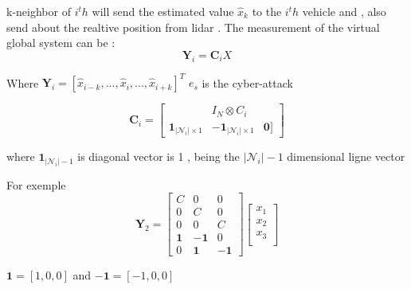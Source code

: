 \documentclass[letterpaper, 10pt, conference]{ieeeconf}  %
\begin{document}

k-neighbor of $i^th$ will send the estimated value $\hat{x}_k $ to the $i^th$ vehicle and , also send about the realtive position from lidar . The measurement of the virtual global system can be :
\begin{equation*}\label{CACC}
      \mathbf{Y}_i = \mathbf{C}_i X    
\end{equation*}  

Where $\mathbf{Y}_i = [\hat{x}_{i-k} ,..., \hat{x}_{i},..., \hat{x}_{i+k} ]^T$  
$e_s$ is the cyber-attack  

\begin{equation}
\mathbf{C}_i=\left[\begin{array}{ccc}
 & I_N \otimes C_i & \\
\mathbf{1}_{\left|\mathcal{N}_i\right| \times 1} & \mathbf{-1}_{\left|\mathcal{N}_i\right| \times 1} & \mathbf{0}]
\end{array}\right]
\end{equation}

where $\mathbf{1}_{\left|\mathcal{N}_i\right|-1 }$
is diagonal vector is 1 , being the $\left|\mathcal{N}_i\right|-1$ dimensional ligne vector 

For exemple 
\begin{equation}
    \mathbf{Y}_2 = \begin{bmatrix}
         C & 0 & 0    \\
         0 & C & 0   \\
         0 & 0 & C   \\
         \mathbf{1} & -\mathbf{1} & 0    \\
         0 & \mathbf{1} & -\mathbf{1}      
     \end{bmatrix}
     \begin{bmatrix}
     x_1 \\
    x_2 \\
    x_3 \\
    \end{bmatrix}
\end{equation}

$\mathbf{1} = [1,0,0]$ and $\mathbf{-1} = [-1,0,0]$   

\end{document}
